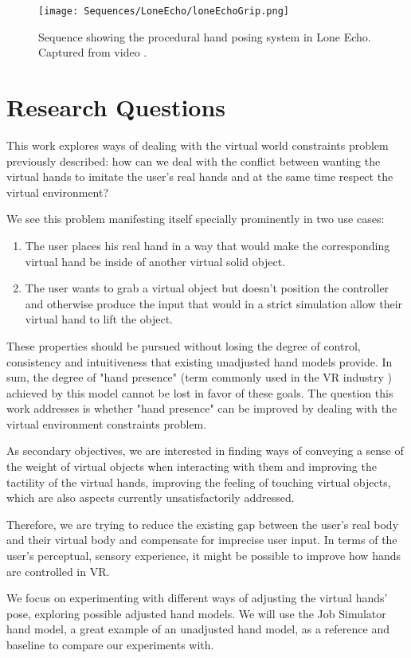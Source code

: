 \begin{figure}[H]
\centering
\texttt{[image: Sequences/LoneEcho/loneEchoGrip.png]}
\caption{Sequence showing the procedural hand posing system in Lone Echo. Captured from video \parencite{loneEchoVideo}.}
\label{fig:loneEchoGrip}
\end{figure}

\section{Research Questions}
\label{sec:researchQuestions}

This work explores ways of dealing with the virtual world constraints problem previously described: how can we deal with the conflict between wanting the virtual hands to imitate the user's real hands and at the same time respect the virtual environment?

We see this problem manifesting itself specially prominently in two use cases:

\begin{enumerate}
\item The user places his real hand in a way that would make the corresponding virtual hand be inside of another virtual solid object.
\item The user wants to grab a virtual object but doesn't position the controller and otherwise produce the input that would in a strict simulation allow their virtual hand to lift the object.
\end{enumerate}

These properties should be pursued without losing the degree of control, consistency and intuitiveness that existing unadjusted hand models provide. In sum, the degree of "hand presence" (term commonly used in the VR industry \parencite{Bye2016}) achieved by this model cannot be lost in favor of these goals. The question this work addresses is whether "hand presence" can be improved by dealing with the virtual environment constraints problem.

As secondary objectives, we are interested in finding ways of conveying a sense of the weight of virtual objects when interacting with them and improving the tactility of the virtual hands, improving the feeling of touching virtual objects, which are also aspects currently unsatisfactorily addressed.

Therefore, we are trying to reduce the existing gap between the user's real body and their virtual body and compensate for imprecise user input. In terms of the user's perceptual, sensory experience, it might be possible to improve how hands are controlled in VR.

We focus on experimenting with different ways of adjusting the virtual hands' pose, exploring possible adjusted hand models. We will use the Job Simulator hand model, a great example of an unadjusted hand model, as a reference and baseline to compare our experiments with.